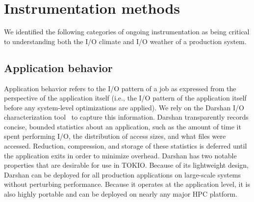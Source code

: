 \section{Instrumentation methods} \label{sec:methods}


We identified the following categories of ongoing instrumentation as being
critical to understanding both the I/O climate and I/O weather of a
production system.  

\subsection{Application behavior}
\label{sec:methods/darshan}

Application behavior refers to the I/O pattern of a job as expressed from
the perspective of the application itself (i.e., the I/O pattern of the
application itself before any system-level optimizations are applied).
We rely on the Darshan I/O characterization tool~\cite{carns200924}
to capture this information.  Darshan transparently records concise,
bounded statistics about an application, such as the amount of time it
spent performing I/O, the distribution of access sizes, and what files
were accessed.  Reduction, compression, and storage of these statistics
is deferred until the application exits in order to minimize overhead.
Darshan has two notable properties that are desirable for use in TOKIO.
Because of its lightweight design, Darshan can be deployed for all
production applications on large-scale systems without perturbing
performance.  Because it operates at the application level, it is also highly
portable and can be deployed on nearly any major HPC platform.

%


